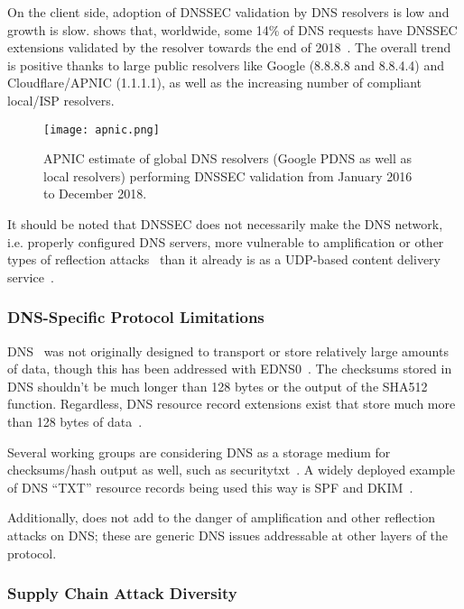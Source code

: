 On the client side, adoption of DNSSEC validation by DNS resolvers is low and
growth is slow.  shows that, worldwide, some 14\% of DNS requests
have DNSSEC extensions validated by the resolver towards the end of
2018~\cite{APNIC}. The overall trend is positive thanks to large public
resolvers like Google (8.8.8.8 and 8.8.4.4) and Cloudflare/APNIC (1.1.1.1), as
well as the increasing number of compliant local/ISP resolvers.

\begin{figure}[t]
    \centering
    \texttt{[image: apnic.png]}
    \caption{APNIC estimate of global DNS resolvers (Google PDNS as well as
    local resolvers) performing DNSSEC validation from January 2016 to December
    2018.}\label{fig:apnic}
\end{figure}

It should be noted that DNSSEC does not necessarily make the DNS network, i.e.
properly configured DNS servers, more vulnerable to amplification or other types
of reflection attacks~\cite{Ariya} than it already is as a UDP-based content
delivery service~\cite{USCERT, Vixie}.

\subsubsection{DNS-Specific Protocol Limitations}

DNS~\cite{DNS1} was not originally designed to transport or store relatively
large amounts of data, though this has been addressed with EDNS0~\cite{EDNS}.
The checksums stored in DNS shouldn't be much longer than 128 bytes or the
output of the SHA512 function. Regardless, DNS resource record extensions exist
that store much more than 128 bytes of data~\cite{CERT, IPSECKEY, DANE3, DANE1}.

Several working groups are considering DNS as a storage medium for
checksums/hash output as well, such as securitytxt~\cite{draft-sectxt}. A widely
deployed example of DNS ``TXT'' resource records being used this way is SPF and
DKIM~\cite{DKIM}.

Additionally, \SYSTEM{} does not add to the danger of amplification and other
reflection attacks on DNS; these are generic DNS issues addressable at other
layers of the protocol.

\subsubsection{Supply Chain Attack Diversity}

